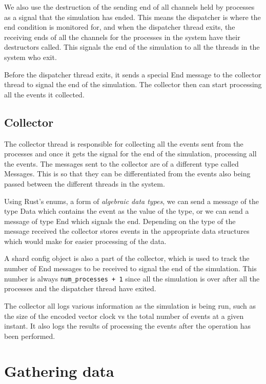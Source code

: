 \documentclass[]{article}
\begin{document}
We also use the destruction of the sending end of all channels held by
processes as a signal that the simulation has ended. This means the
dispatcher is where the end condition is monitored for, and when the
dispatcher thread exits, the receiving ends of all the channels for the
processes in the system have their destructors called. This signals the
end of the simulation to all the threads in the system who exit.

Before the dispatcher thread exits, it sends a special End message to
the collector thread to signal the end of the simulation. The collector
then can start processing all the events it collected.

\hypertarget{collector}{%
\subsection{Collector}\label{collector}}

The collector thread is responsible for collecting all the events sent
from the processes and once it gets the signal for the end of the
simulation, processing all the events. The messages sent to the
collector are of a different type called Messages. This is so that they
can be differentiated from the events also being passed between the
different threads in the system.

Using Rust's enums, a form of \emph{algebraic data types}, we can send a
message of the type Data which contains the event as the value of the
type, or we can send a message of type End which signals the end.
Depending on the type of the message received the collector stores
events in the appropriate data structures which would make for easier
processing of the data.

A shard config object is also a part of the collector, which is used to
track the number of End messages to be received to signal the end of the
simulation. This number is always \texttt{num\_processes\ +\ 1} since
all the simulation is over after all the processes and the dispatcher
thread have exited.

The collector all logs various information as the simulation is being
run, such as the size of the encoded vector clock vs the total number of
events at a given instant. It also logs the results of processing the
events after the operation has been performed.

\hypertarget{gathering-data}{%
\section{Gathering data}\label{gathering-data}}
\end{document}
